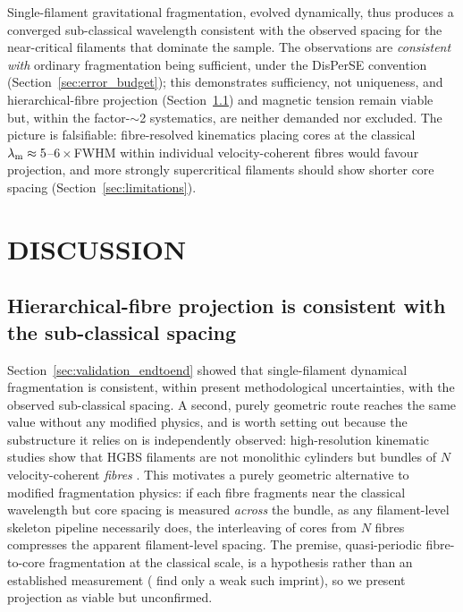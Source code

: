 \documentclass[usenatbib,twoside,twocolumn]{mnras}
\begin{document}
Single-filament gravitational fragmentation, evolved dynamically, thus produces a converged sub-classical wavelength consistent with the observed spacing for the near-critical filaments that dominate the sample. The observations are \emph{consistent with} ordinary fragmentation being sufficient, under the DisPerSE convention (Section~\ref{sec:error_budget}); this demonstrates sufficiency, not uniqueness, and hierarchical-fibre projection (Section~\ref{sec:fibre_projection}) and magnetic tension remain viable but, within the factor-$\sim$2 systematics, are neither demanded nor excluded. The picture is falsifiable: fibre-resolved kinematics placing cores at the classical $\lambda_{\rm m}\approx5$--$6\times$FWHM within individual velocity-coherent fibres would favour projection, and more strongly supercritical filaments should show shorter core spacing (Section~\ref{sec:limitations}).

\section{DISCUSSION}
\label{sec:discussion}

\subsection{Hierarchical-fibre projection is consistent with the sub-classical spacing}
\label{sec:fibre_projection}

Section~\ref{sec:validation_endtoend} showed that single-filament dynamical fragmentation is consistent, within present methodological uncertainties, with the observed sub-classical spacing. A second, purely geometric route reaches the same value without any modified physics, and is worth setting out because the substructure it relies on is independently observed: high-resolution kinematic studies show that HGBS filaments are not monolithic cylinders but bundles of $N$ velocity-coherent \emph{fibres} \citep{Hacar2013,Hacar2018,Yang2024}. This motivates a purely geometric alternative to modified fragmentation physics: if each fibre fragments near the classical wavelength but core spacing is measured \emph{across} the bundle, as any filament-level skeleton pipeline necessarily does, the interleaving of cores from $N$ fibres compresses the apparent filament-level spacing. The premise, quasi-periodic fibre-to-core fragmentation at the classical scale, is a hypothesis rather than an established measurement (\citealt{Yang2024} find only a weak such imprint), so we present projection as viable but unconfirmed.
\end{document}

